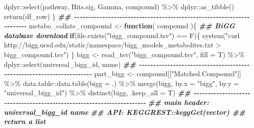 \documentclass[
]{article}
\newenvironment{Shaded}{\begin{snugshade}}{\end{snugshade}}
\newcommand{\AttributeTok}[1]{\textcolor[rgb]{0.77,0.63,0.00}{#1}}
\newcommand{\ControlFlowTok}[1]{\textcolor[rgb]{0.13,0.29,0.53}{\textbf{#1}}}
\newcommand{\DocumentationTok}[1]{\textcolor[rgb]{0.56,0.35,0.01}{\textbf{\textit{#1}}}}
\newcommand{\FunctionTok}[1]{\textcolor[rgb]{0.00,0.00,0.00}{#1}}
\newcommand{\NormalTok}[1]{#1}
\newcommand{\OtherTok}[1]{\textcolor[rgb]{0.56,0.35,0.01}{#1}}
\newcommand{\SpecialCharTok}[1]{\textcolor[rgb]{0.00,0.00,0.00}{#1}}
\newcommand{\StringTok}[1]{\textcolor[rgb]{0.31,0.60,0.02}{#1}}
\begin{document}
\begin{Shaded}
\begin{Highlighting}[]
\NormalTok{      dplyr}\SpecialCharTok{::}\FunctionTok{select}\NormalTok{(pathway, Hits.sig, Gamma, compound) }\SpecialCharTok{\%\textgreater{}\%}
\NormalTok{      dplyr}\SpecialCharTok{::}\FunctionTok{as\_tibble}\NormalTok{()}
    \FunctionTok{return}\NormalTok{(df\_row)}
\NormalTok{  \}}
\DocumentationTok{\#\# {-}{-}{-}{-}{-}{-}{-}{-}{-}{-}{-}{-}{-}{-}{-}{-}{-}{-}{-}{-}{-}{-}{-}{-}{-}{-}{-}{-}{-}{-}{-}{-}{-}{-}{-}{-}{-}{-}{-}{-}{-}{-}{-}{-}{-}{-}{-}{-}{-}{-}{-}{-}{-}{-}{-}{-}{-}{-}{-}{-}{-}{-}{-}{-}{-}{-}{-}{-}{-}{-}}
\NormalTok{metabo\_collate\_compound }\OtherTok{\textless{}{-}} 
  \ControlFlowTok{function}\NormalTok{(}
\NormalTok{           compound}
\NormalTok{           )\{}
    \DocumentationTok{\#\# BiGG database download}
    \ControlFlowTok{if}\NormalTok{(}\FunctionTok{file.exists}\NormalTok{(}\StringTok{"bigg\_compound.tsv"}\NormalTok{) }\SpecialCharTok{==}\NormalTok{ F)\{}
      \FunctionTok{system}\NormalTok{(}\StringTok{"curl http://bigg.ucsd.edu/static/namespace/bigg\_models\_metabolites.txt \textgreater{} bigg\_compound.tsv"}\NormalTok{)}
\NormalTok{    \}}
\NormalTok{    bigg }\OtherTok{\textless{}{-}} \FunctionTok{read\_tsv}\NormalTok{(}\StringTok{"bigg\_compound.tsv"}\NormalTok{, }\AttributeTok{fill =}\NormalTok{ T) }\SpecialCharTok{\%\textgreater{}\%} 
\NormalTok{      dplyr}\SpecialCharTok{::}\FunctionTok{select}\NormalTok{(universal\_bigg\_id, name)}
    \DocumentationTok{\#\# {-}{-}{-}{-}{-}{-}{-}{-}{-}{-}{-}{-}{-}{-}{-}{-}{-}{-}{-}{-}{-}{-}{-}{-}{-}{-}{-}{-}{-}{-}{-}{-}{-}{-}{-}{-}{-}{-}{-}{-}{-}{-}{-}{-}{-}{-}{-}{-}{-}{-}{-}{-}{-}{-}{-}{-}{-}{-}{-}{-}{-}{-}{-}{-}{-}{-}{-}{-}{-}{-} }
\NormalTok{    part\_bigg }\OtherTok{\textless{}{-}}\NormalTok{ compound[[}\StringTok{"Matched.Compound"}\NormalTok{]] }\SpecialCharTok{\%\textgreater{}\%} 
\NormalTok{      data.table}\SpecialCharTok{::}\FunctionTok{data.table}\NormalTok{(}\AttributeTok{bigg =}\NormalTok{ .) }\SpecialCharTok{\%\textgreater{}\%} 
      \FunctionTok{merge}\NormalTok{(bigg, }\AttributeTok{by.x =} \StringTok{"bigg"}\NormalTok{, }\AttributeTok{by.y =} \StringTok{"universal\_bigg\_id"}\NormalTok{) }\SpecialCharTok{\%\textgreater{}\%} 
      \FunctionTok{distinct}\NormalTok{(bigg, }\AttributeTok{.keep\_all =}\NormalTok{ T)}
    \DocumentationTok{\#\# {-}{-}{-}{-}{-}{-}{-}{-}{-}{-}{-}{-}{-}{-}{-}{-}{-}{-}{-}{-}{-}{-}{-}{-}{-}{-}{-}{-}{-}{-}{-}{-}{-}{-}{-}{-}{-}{-}{-}{-}{-}{-}{-}{-}{-}{-}{-}{-}{-}{-}{-}{-}{-}{-}{-}{-}{-}{-}{-}{-}{-}{-}{-}{-}{-}{-}{-}{-}{-}{-} }
    \DocumentationTok{\#\# main header: universal\_bigg\_id name}
    \DocumentationTok{\#\# API: KEGGREST::keggGet(vector) \#\# return a list}

\end{Highlighting}
\end{Shaded}
\end{document}
